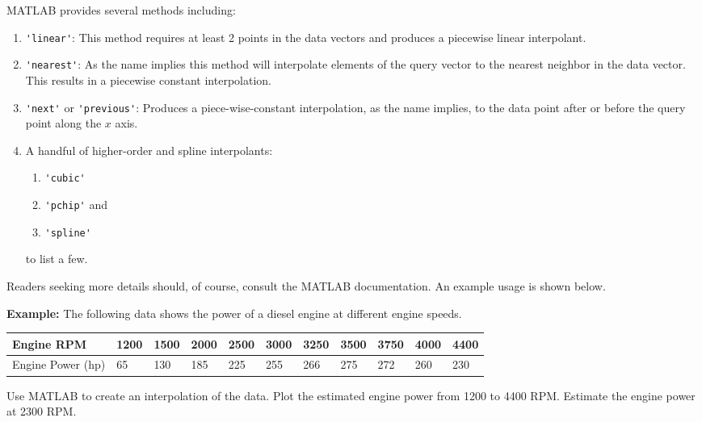 MATLAB provides several methods including:
\begin{enumerate}
\item \lstinline[style=myMatlab]{'linear'}: This method requires at least 2 points in the data vectors and produces a piecewise linear interpolant.

\item \lstinline[style=myMatlab]{'nearest'}:  As the name implies this method will interpolate elements of the query vector to the nearest neighbor in the data vector.  This results in a piecewise constant interpolation.

\item \lstinline[style=myMatlab]{'next'} or \lstinline[style=myMatlab]{'previous'}:  Produces a piece-wise-constant interpolation, as the name implies, to the data point after or before the query point along the $x$ axis.

\item A handful of higher-order and spline interpolants:
\begin{enumerate}
\item \lstinline[style=myMatlab]{'cubic'} 
\item \lstinline[style=myMatlab]{'pchip'} and 
\item \lstinline[style=myMatlab]{'spline'} 
\end{enumerate}
to list a few.  

\end{enumerate}
Readers seeking more details should, of course, consult the MATLAB documentation.  An example usage is shown below.

\vspace{0.25cm}

\noindent\textbf{Example: } The following data shows the power of a diesel engine at different engine speeds.

\begin{table}
\begin{tabular}{|l|l|l|l|l|l|l|l|l|l|l|}
\hline
Engine RPM & 1200 & 1500 & 2000 & 2500 & 3000 & 3250 & 3500 & 3750 & 4000 & 4400 \\\hline
Engine Power (hp) & 65 & 130 & 185 & 225 & 255 & 266 & 275 & 272 & 260 & 230 \\ \hline
\end{tabular}
\end{table}
Use MATLAB to create an interpolation of the data.  Plot the estimated engine power from 1200 to 4400 RPM.  Estimate the engine power at 2300 RPM.


